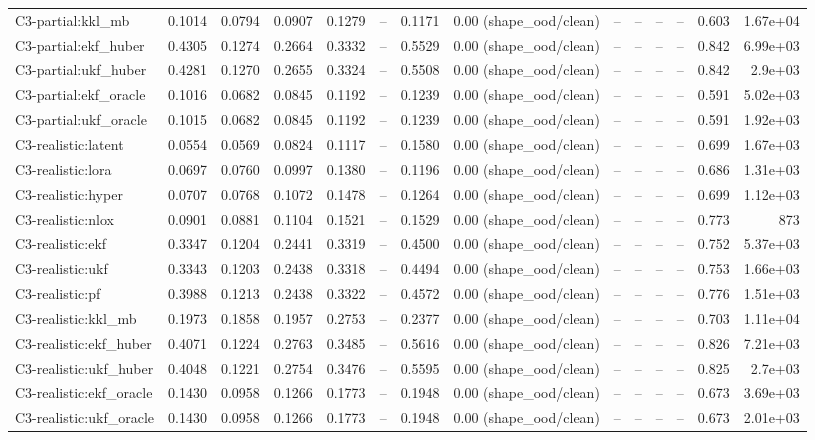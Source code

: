 \begin{table}[t]
\begin{tabular}{lrrrrrrrrrrrrr}
C3-partial:kkl\_mb & 0.1014 & 0.0794 & 0.0907 & 0.1279 & – & 0.1171 & 0.00 (shape\_ood/clean) & – & – & – & – & 0.603 & 1.67e+04 \\
C3-partial:ekf\_huber & 0.4305 & 0.1274 & 0.2664 & 0.3332 & – & 0.5529 & 0.00 (shape\_ood/clean) & – & – & – & – & 0.842 & 6.99e+03 \\
C3-partial:ukf\_huber & 0.4281 & 0.1270 & 0.2655 & 0.3324 & – & 0.5508 & 0.00 (shape\_ood/clean) & – & – & – & – & 0.842 & 2.9e+03 \\
C3-partial:ekf\_oracle & 0.1016 & 0.0682 & 0.0845 & 0.1192 & – & 0.1239 & 0.00 (shape\_ood/clean) & – & – & – & – & 0.591 & 5.02e+03 \\
C3-partial:ukf\_oracle & 0.1015 & 0.0682 & 0.0845 & 0.1192 & – & 0.1239 & 0.00 (shape\_ood/clean) & – & – & – & – & 0.591 & 1.92e+03 \\
C3-realistic:latent & 0.0554 & 0.0569 & 0.0824 & 0.1117 & – & 0.1580 & 0.00 (shape\_ood/clean) & – & – & – & – & 0.699 & 1.67e+03 \\
C3-realistic:lora & 0.0697 & 0.0760 & 0.0997 & 0.1380 & – & 0.1196 & 0.00 (shape\_ood/clean) & – & – & – & – & 0.686 & 1.31e+03 \\
C3-realistic:hyper & 0.0707 & 0.0768 & 0.1072 & 0.1478 & – & 0.1264 & 0.00 (shape\_ood/clean) & – & – & – & – & 0.699 & 1.12e+03 \\
C3-realistic:nlox & 0.0901 & 0.0881 & 0.1104 & 0.1521 & – & 0.1529 & 0.00 (shape\_ood/clean) & – & – & – & – & 0.773 & 873 \\
C3-realistic:ekf & 0.3347 & 0.1204 & 0.2441 & 0.3319 & – & 0.4500 & 0.00 (shape\_ood/clean) & – & – & – & – & 0.752 & 5.37e+03 \\
C3-realistic:ukf & 0.3343 & 0.1203 & 0.2438 & 0.3318 & – & 0.4494 & 0.00 (shape\_ood/clean) & – & – & – & – & 0.753 & 1.66e+03 \\
C3-realistic:pf & 0.3988 & 0.1213 & 0.2438 & 0.3322 & – & 0.4572 & 0.00 (shape\_ood/clean) & – & – & – & – & 0.776 & 1.51e+03 \\
C3-realistic:kkl\_mb & 0.1973 & 0.1858 & 0.1957 & 0.2753 & – & 0.2377 & 0.00 (shape\_ood/clean) & – & – & – & – & 0.703 & 1.11e+04 \\
C3-realistic:ekf\_huber & 0.4071 & 0.1224 & 0.2763 & 0.3485 & – & 0.5616 & 0.00 (shape\_ood/clean) & – & – & – & – & 0.826 & 7.21e+03 \\
C3-realistic:ukf\_huber & 0.4048 & 0.1221 & 0.2754 & 0.3476 & – & 0.5595 & 0.00 (shape\_ood/clean) & – & – & – & – & 0.825 & 2.7e+03 \\
C3-realistic:ekf\_oracle & 0.1430 & 0.0958 & 0.1266 & 0.1773 & – & 0.1948 & 0.00 (shape\_ood/clean) & – & – & – & – & 0.673 & 3.69e+03 \\
C3-realistic:ukf\_oracle & 0.1430 & 0.0958 & 0.1266 & 0.1773 & – & 0.1948 & 0.00 (shape\_ood/clean) & – & – & – & – & 0.673 & 2.01e+03 \\
\bottomrule
\end{tabular}
\end{table}

